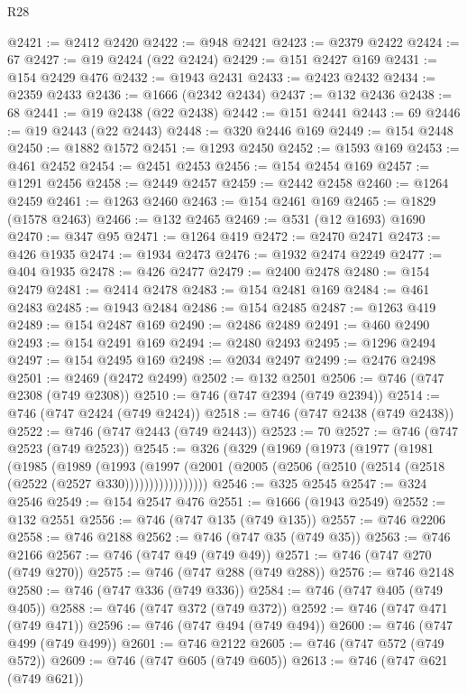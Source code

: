 \begin{lexlean}{R28}
\begin{coremodule}
@2421 := @2412 @2420
@2422 := @948 @2421
@2423 := @2379 @2422
@2424 := 67
@2427 := @19 @2424 (@22 @2424)
@2429 := @151 @2427 @169
@2431 := @154 @2429 @476
@2432 := @1943 @2431
@2433 := @2423 @2432
@2434 := @2359 @2433
@2436 := @1666 (@2342 @2434)
@2437 := @132 @2436
@2438 := 68
@2441 := @19 @2438 (@22 @2438)
@2442 := @151 @2441
@2443 := 69
@2446 := @19 @2443 (@22 @2443)
@2448 := @320 @2446 @169
@2449 := @154 @2448
@2450 := @1882 @1572
@2451 := @1293 @2450
@2452 := @1593 @169
@2453 := @461 @2452
@2454 := @2451 @2453
@2456 := @154 @2454 @169
@2457 := @1291 @2456
@2458 := @2449 @2457
@2459 := @2442 @2458
@2460 := @1264 @2459
@2461 := @1263 @2460
@2463 := @154 @2461 @169
@2465 := @1829 (@1578 @2463)
@2466 := @132 @2465
@2469 := @531 (@12 @1693) @1690
@2470 := @347 @95
@2471 := @1264 @419
@2472 := @2470 @2471
@2473 := @426 @1935
@2474 := @1934 @2473
@2476 := @1932 @2474 @2249
@2477 := @404 @1935
@2478 := @426 @2477
@2479 := @2400 @2478
@2480 := @154 @2479
@2481 := @2414 @2478
@2483 := @154 @2481 @169
@2484 := @461 @2483
@2485 := @1943 @2484
@2486 := @154 @2485
@2487 := @1263 @419
@2489 := @154 @2487 @169
@2490 := @2486 @2489
@2491 := @460 @2490
@2493 := @154 @2491 @169
@2494 := @2480 @2493
@2495 := @1296 @2494
@2497 := @154 @2495 @169
@2498 := @2034 @2497
@2499 := @2476 @2498
@2501 := @2469 (@2472 @2499)
@2502 := @132 @2501
@2506 := @746 (@747 @2308 (@749 @2308))
@2510 := @746 (@747 @2394 (@749 @2394))
@2514 := @746 (@747 @2424 (@749 @2424))
@2518 := @746 (@747 @2438 (@749 @2438))
@2522 := @746 (@747 @2443 (@749 @2443))
@2523 := 70
@2527 := @746 (@747 @2523 (@749 @2523))
@2545 := @326
    (@329
      (@1969
        (@1973
          (@1977
            (@1981
              (@1985
                (@1989
                  (@1993
                    (@1997
                      (@2001 (@2005 (@2506 (@2510 (@2514 (@2518 (@2522 (@2527 @330)))))))))))))))))
@2546 := @325 @2545
@2547 := @324 @2546
@2549 := @154 @2547 @476
@2551 := @1666 (@1943 @2549)
@2552 := @132 @2551
@2556 := @746 (@747 @135 (@749 @135))
@2557 := @746 @2206
@2558 := @746 @2188
@2562 := @746 (@747 @35 (@749 @35))
@2563 := @746 @2166
@2567 := @746 (@747 @49 (@749 @49))
@2571 := @746 (@747 @270 (@749 @270))
@2575 := @746 (@747 @288 (@749 @288))
@2576 := @746 @2148
@2580 := @746 (@747 @336 (@749 @336))
@2584 := @746 (@747 @405 (@749 @405))
@2588 := @746 (@747 @372 (@749 @372))
@2592 := @746 (@747 @471 (@749 @471))
@2596 := @746 (@747 @494 (@749 @494))
@2600 := @746 (@747 @499 (@749 @499))
@2601 := @746 @2122
@2605 := @746 (@747 @572 (@749 @572))
@2609 := @746 (@747 @605 (@749 @605))
@2613 := @746 (@747 @621 (@749 @621))

\end{coremodule}
\end{lexlean}
